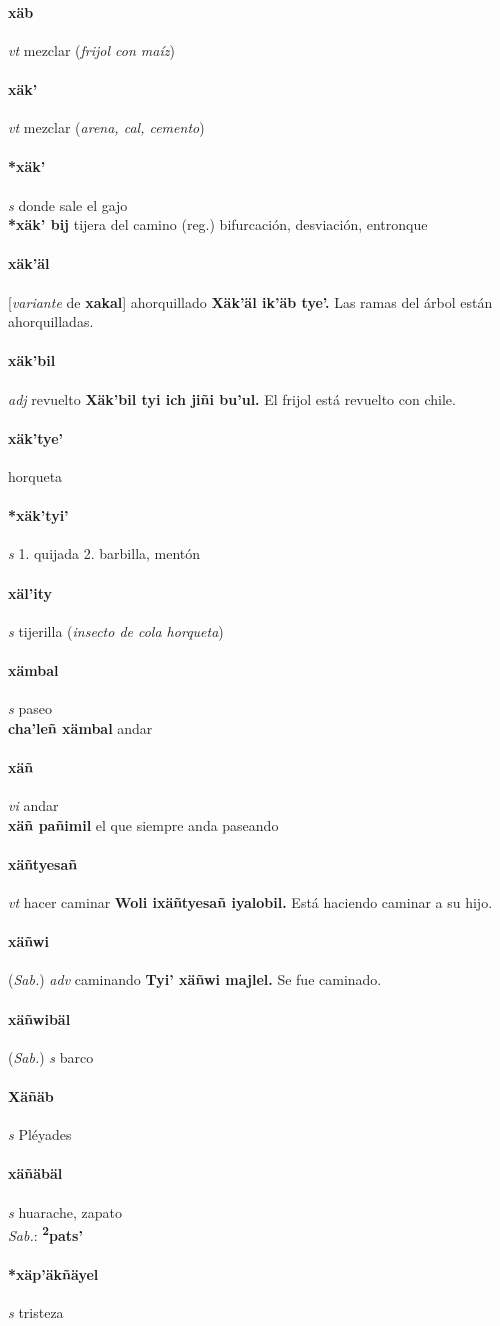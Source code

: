 \documentclass{scrbook}
\newcommand{\entry}[1]{\paragraph{#1}}
\newcommand{\onedefinition}[1]{#1.}
\newcommand{\partofspeech}[1]{\textit{#1}}
\newcommand{\spanishtranslation}[1]{#1}
\newcommand{\clarification}[1]{(\textit{#1})}
\newcommand{\cholexample}[1]{\textbf{#1}}
\newcommand{\exampletranslation}[1]{#1}
\newcommand{\dialectvariant}[1]{\\\textit{#1}:}
\newcommand{\dialectword}[1]{\textbf{#1}}
\newcommand{\relevantdialect}[1]{(\textit{#1})}
\newcommand{\secondaryentry}[1]{\\\textbf{#1}}
\newcommand{\secondtranslation}[1]{#1}
\newcommand{\conjugationtense}[1]{[\textit{#1}}
\newcommand{\conjugationverb}[1]{de \textbf{#1}]}
\begin{document}
\begin{multicols}{2}
\entry{xäb}
\partofspeech{vt}
\spanishtranslation{mezclar}
\clarification{frijol con maíz}

\entry{xäk'}
\partofspeech{vt}
\spanishtranslation{mezclar}
\clarification{arena, cal, cemento}

\entry{*xäk'}
\partofspeech{s}
\spanishtranslation{donde sale el gajo}
\secondaryentry{*xäk' bij}
\secondtranslation{tijera del camino (reg.)}
\secondtranslation{bifurcación, desviación, entronque}

\entry{xäk'äl}
\conjugationtense{variante}
\conjugationverb{xakal}
\spanishtranslation{ahorquillado}
\cholexample{Xäk'äl ik'äb tye'.}
\exampletranslation{Las ramas del árbol están ahorquilladas.}

\entry{xäk'bil}
\partofspeech{adj}
\spanishtranslation{revuelto}
\cholexample{Xäk'bil tyi ich jiñi bu'ul.}
\exampletranslation{El frijol está revuelto con chile.}

\entry{xäk'tye'}
\spanishtranslation{horqueta}

\entry{*xäk'tyi'}
\partofspeech{s}
\onedefinition{1}
\spanishtranslation{quijada}
\onedefinition{2}
\spanishtranslation{barbilla, mentón}

\entry{xäl'ity}
\partofspeech{s}
\spanishtranslation{tijerilla}
\clarification{insecto de cola horqueta}

\entry{xämbal}
\partofspeech{s}
\spanishtranslation{paseo}
\secondaryentry{cha'leñ xämbal}
\secondtranslation{andar}

\entry{xäñ}
\partofspeech{vi}
\spanishtranslation{andar}
\secondaryentry{xäñ pañimil}
\secondtranslation{el que siempre anda paseando}

\entry{xäñtyesañ}
\partofspeech{vt}
\spanishtranslation{hacer caminar}
\cholexample{Woli ixäñtyesañ iyalobil.}
\exampletranslation{Está haciendo caminar a su hijo.}

\entry{xäñwi}
\relevantdialect{Sab.}
\partofspeech{adv}
\spanishtranslation{caminando}
\cholexample{Tyi' xäñwi majlel.}
\exampletranslation{Se fue caminado.}

\entry{xäñwibäl}
\relevantdialect{Sab.}
\partofspeech{s}
\spanishtranslation{barco}

\entry{Xäñäb}
\partofspeech{s}
\spanishtranslation{Pléyades}

\entry{xäñäbäl}
\partofspeech{s}
\spanishtranslation{huarache, zapato}
\dialectvariant{Sab.}
\dialectword{\textsuperscript{2}pats'}

\entry{*xäp'äkñäyel}
\partofspeech{s}
\spanishtranslation{tristeza}


\end{multicols}
\end{document}
